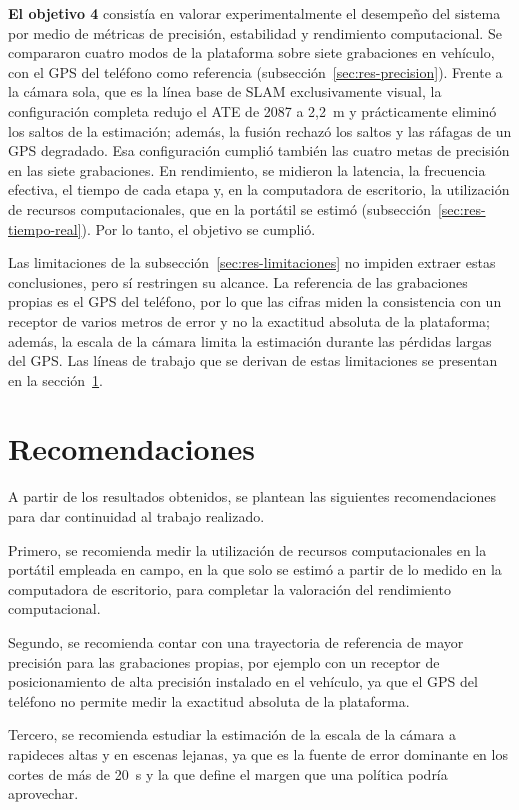 \textbf{El objetivo 4} consistía en valorar experimentalmente el desempeño del sistema por medio de métricas de precisión, estabilidad y rendimiento computacional.
Se compararon cuatro modos de la plataforma sobre siete grabaciones en vehículo, con el GPS del teléfono como referencia (subsección~\ref{sec:res-precision}).
Frente a la cámara sola, que es la línea base de SLAM exclusivamente visual, la configuración completa redujo el ATE de 2087 a 2,2~m y prácticamente eliminó los saltos de la estimación; además, la fusión rechazó los saltos y las ráfagas de un GPS degradado.
Esa configuración cumplió también las cuatro metas de precisión en las siete grabaciones.
En rendimiento, se midieron la latencia, la frecuencia efectiva, el tiempo de cada etapa y, en la computadora de escritorio, la utilización de recursos computacionales, que en la portátil se estimó (subsección~\ref{sec:res-tiempo-real}).
Por lo tanto, el objetivo se cumplió.

Las limitaciones de la subsección~\ref{sec:res-limitaciones} no impiden extraer estas conclusiones, pero sí restringen su alcance.
La referencia de las grabaciones propias es el GPS del teléfono, por lo que las cifras miden la consistencia con un receptor de varios metros de error y no la exactitud absoluta de la plataforma; además, la escala de la cámara limita la estimación durante las pérdidas largas del GPS.
Las líneas de trabajo que se derivan de estas limitaciones se presentan en la sección~\ref{sec:recomendaciones}.

\section{Recomendaciones}
\label{sec:recomendaciones}

A partir de los resultados obtenidos, se plantean las siguientes recomendaciones para dar continuidad al trabajo realizado.

Primero, se recomienda medir la utilización de recursos computacionales en la portátil empleada en campo, en la que solo se estimó a partir de lo medido en la computadora de escritorio, para completar la valoración del rendimiento computacional.

Segundo, se recomienda contar con una trayectoria de referencia de mayor precisión para las grabaciones propias, por ejemplo con un receptor de posicionamiento de alta precisión instalado en el vehículo, ya que el GPS del teléfono no permite medir la exactitud absoluta de la plataforma.

Tercero, se recomienda estudiar la estimación de la escala de la cámara a rapideces altas y en escenas lejanas, ya que es la fuente de error dominante en los cortes de más de 20~s y la que define el margen que una política podría aprovechar.

